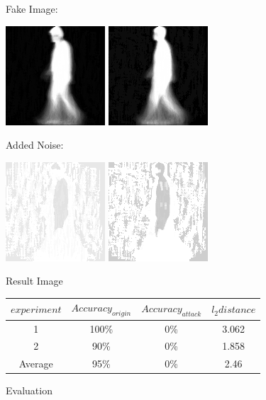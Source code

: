 \documentclass[letterpaper]{article} %
\begin{document}
\begin{figure}
Fake Image:

\includegraphics[width=0.3\columnwidth]{dl3.png}
\includegraphics[width=0.3\columnwidth]{ex2-fake.png}

Added Noise:

\includegraphics[width=0.3\columnwidth]{dlnoise.png}
\includegraphics[width=0.3\columnwidth]{ex2-noise.png}

\caption{Result Image}
\label{fig2}
\end{figure}

\begin{figure}[htbp]
\centering
\caption{Evaluation}
\label{vtable}
\begin{tabular}{c|c|c|c}
\hline
$experiment$ & $Accuracy_{origin}$ & $Accuracy_{attack}$ & $l_2 distance$ \\
\hline
1 & 100\% & 0\% & 3.062  \\
2 & 90\% & 0\% & 1.858 \\
Average & 95\% & 0\% & 2.46\\ 
\hline
\end{tabular}
\end{figure}
\end{document}
